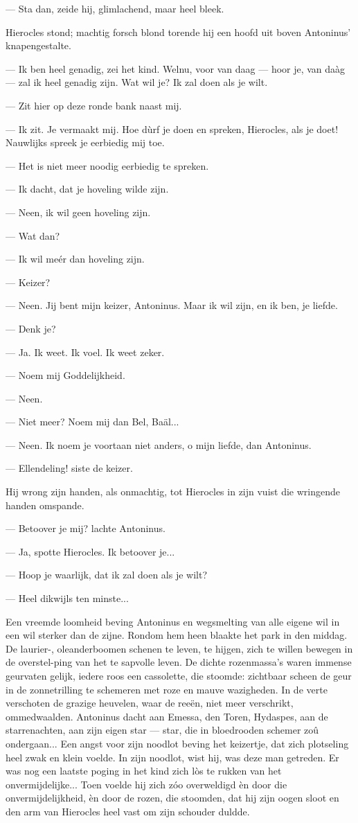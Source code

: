 \documentclass[a4paper, 12pt, oneside, dutch]{article}
\begin{document}
--- Sta dan, zeide hij, glimlachend, maar heel bleek.

Hierocles stond; machtig forsch blond torende hij een hoofd uit boven Antoninus' knapengestalte.

--- Ik ben heel genadig, zei het kind. Welnu, voor van daag --- hoor je, van daàg --- zal ik heel genadig zijn. Wat wil je? Ik zal doen als je wilt.

--- Zit hier op deze ronde bank naast mij.

--- Ik zit. Je vermaakt mij. Hoe dùrf je doen en spreken, Hierocles, als je doet! Nauwlijks spreek je eerbiedig mij toe.

--- Het is niet meer noodig eerbiedig te spreken.

--- Ik dacht, dat je hoveling wilde zijn.

--- Neen, ik wil geen hoveling zijn.

--- Wat dan?

--- Ik wil meér dan hoveling zijn.

--- Keizer?

--- Neen. Jij bent mijn keizer, Antoninus. Maar ik wil zijn, en ik ben, je liefde.

--- Denk je?

--- Ja. Ik weet. Ik voel. Ik weet zeker.

--- Noem mij Goddelijkheid.

--- Neen.

--- Niet meer? Noem mij dan Bel, Baäl...

--- Neen. Ik noem je voortaan niet anders, o mijn liefde, dan Antoninus.

--- Ellendeling! siste de keizer.

Hij wrong zijn handen, als onmachtig, tot Hierocles in zijn vuist die wringende handen omspande.

--- Betoover je mij? lachte Antoninus.

--- Ja, spotte Hierocles. Ik betoover je...

--- Hoop je waarlijk, dat ik zal doen als je wilt?

--- Heel dikwijls ten minste...

Een vreemde loomheid beving Antoninus en wegsmelting van alle eigene wil in een wil sterker dan de zijne. Rondom hem heen blaakte het park in den middag. De laurier-, oleanderboomen schenen te leven, te hijgen, zich te willen bewegen in de overstel-ping van het te sapvolle leven. De dichte rozenmassa's waren immense geurvaten gelijk, iedere roos een cassolette, die stoomde: zichtbaar scheen de geur in de zonnetrilling te schemeren met roze en mauve wazigheden. In de verte verschoten de grazige heuvelen, waar de reeën, niet meer verschrikt, ommedwaalden. Antoninus dacht aan Emessa, den Toren, Hydaspes, aan de starrenachten, aan zijn eigen star --- star, die in bloedrooden schemer zoû ondergaan... Een angst voor zijn noodlot beving het keizertje, dat zich plotseling heel zwak en klein voelde. In zijn noodlot, wist hij, was deze man getreden. Er was nog een laatste poging in het kind zich lòs te rukken van het onvermijdelijke... Toen voelde hij zich zóo overweldigd èn door die onvermijdelijkheid, èn door de rozen, die stoomden, dat hij zijn oogen sloot en den arm van Hierocles heel vast om zijn schouder duldde.
\end{document}
